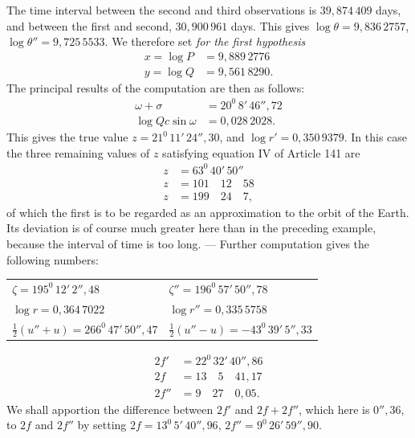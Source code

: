 The time interval between the second and third observations is $39{,}874\,409$ days, and between the first and second, $30{,}900\,961$ days. This gives $\log\theta=9{,}836\,2757$, $\log\theta''=9{,}725\,5533$. We therefore set \textit{for the first hypothesis}
\[
\begin{aligned}
x=\log P&=9{,}889\,2776\\
y=\log Q&=9{,}561\,8290.
\end{aligned}
\]
\noindent The principal results of the computation are then as follows:
\[
\begin{aligned}
\omega+\sigma&=20^0\,8'\,46''{,}72\\
\log Qc\sin\omega&=0{,}028\,2028.
\end{aligned}
\]
\noindent This gives the true value $z=21^0\,11'\,24''{,}30$, and $\log r'=0{,}350\,9379$. In this case the three remaining values of $z$ satisfying equation IV of Article 141 are
\[
\begin{aligned}
z&=63^0\,40'\,50''\\
z&=101\quad12\quad58\\
z&=199\quad24\quad7,
\end{aligned}
\]
\noindent{}of which the first is to be regarded as an approximation to the orbit of the Earth. Its deviation is of course much greater here than in the preceding example, because the interval of time is too long. --- Further computation gives the following numbers:
\begin{center}\begingroup\footnotesize\setlength{\tabcolsep}{6pt}\renewcommand{\arraystretch}{1.3}
\begin{tabular}{ll}
$\zeta=195^0\,12'\,2''{,}48$ & $\zeta''=196^0\,57'\,50''{,}78$\\
$\log r=0{,}364\,7022$ & $\log r''=0{,}335\,5758$\\
$\tfrac12(u''+u)=266^0\,47'\,50''{,}47$ & $\tfrac12(u''-u)=-43^0\,39'\,5''{,}33$
\end{tabular}\endgroup\end{center}
\[
\begin{aligned}
2f'&=22^0\,32'\,40''{,}86\\
2f&=13\quad5\quad41{,}17\\
2f''&=9\quad27\quad0{,}05.
\end{aligned}
\]
\noindent We shall apportion the difference between $2f'$ and $2f+2f''$, which here is $0''{,}36$, to $2f$ and $2f''$ by setting $2f=13^0\,5'\,40''{,}96$, $2f''=9^0\,26'\,59''{,}90$.


